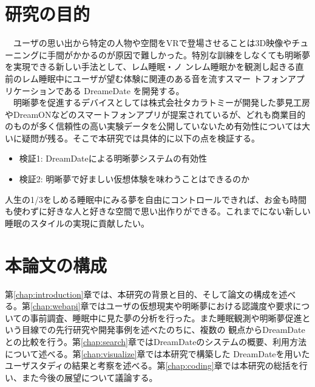 \section{研究の目的}
　ユーザの思い出から特定の人物や空間をVRで登場させることは3D映像やチューニングに手間がかかるのが原因で難しかった。特別な訓練をしなくても明晰夢を実現できる新しい手法として、レム睡眠・ノ ンレム睡眠かを観測し起きる直前のレム睡眠中にユーザが望む体験に関連のある音を流すスマー トフォンアプリケーションである DreameDate を開発する。\\
　明晰夢を促進するデバイスとしては株式会社タカラトミーが開発した夢見工房\cite{takaratomi}やDreamON\cite{dreamOn}などのスマートフォンアプリが提案されているが、どれも商業目的のものが多く信頼性の高い実験データを公開していないため有効性については大いに疑問が残る。そこで本研究では具体的に以下の点を検証する。

\begin{itemize}
\item 検証1: DreamDateによる明晰夢システムの有効性
\item 検証2: 明晰夢で好ましい仮想体験を味わうことはできるのか
\end{itemize}

人生の1/3をしめる睡眠中にみる夢を自由にコントロールできれば、お金も時間も使わずに好きな人と好きな空間で思い出作りができる。これまでにない新しい睡眠のスタイルの実現に貢献したい。
\section{本論文の構成}
第\ref{chap:introduction}章では、本研究の背景と目的、そして論文の構成を述べる。第\ref{chap:webapi}章ではユーザの仮想現実や明晰夢における認識度や要求についての事前調査、睡眠中に見た夢の分析を行った。また睡眠観測や明晰夢促進という目線での先行研究や開発事例を述べたのちに、複数の 観点からDreamDateとの比較を行う。第\ref{chap:search}章ではDreamDateのシステムの概要、利用方法 について述べる。第\ref{chap:visualize}章では本研究で構築した DreamDateを用いたユーザスタディの結果と考察を述べる。第\ref{chap:coding}章では本研究の総括を行い、また今後の展望について議論する。
